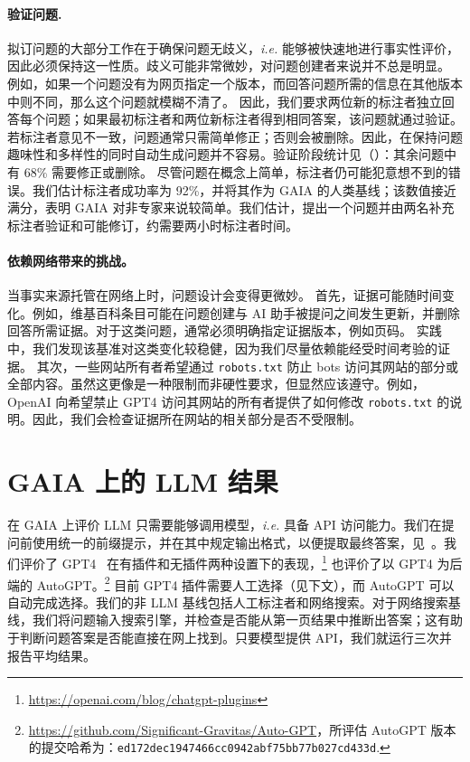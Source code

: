 \documentclass{fairmeta}
\newcommand{\benchmark}{\textsc{GAIA}}
\newcommand{\humanscore}{92\%}
\begin{document}
\paragraph{验证问题.} 拟订问题的大部分工作在于确保问题无歧义，\textit{i.e.} 能够被快速地进行事实性评价，因此必须保持这一性质。歧义可能非常微妙，对问题创建者来说并不总是明显。
例如，如果一个问题没有为网页指定一个版本，而回答问题所需的信息在其他版本中则不同，那么这个问题就模糊不清了。
因此，我们要求两位新的标注者独立回答每个问题；如果最初标注者和两位新标注者得到相同答案，该问题就通过验证。若标注者意见不一致，问题通常只需简单修正；否则会被删除。因此，在保持问题趣味性和多样性的同时自动生成问题并不容易。验证阶段统计见（）：其余问题中有 68\% 需要修正或删除。
尽管问题在概念上简单，标注者仍可能犯意想不到的错误。我们估计标注者成功率为 \humanscore{}，并将其作为 \benchmark{} 的人类基线；该数值接近满分，表明 \benchmark{} 对非专家来说较简单。我们估计，提出一个问题并由两名补充标注者验证和可能修订，约需要两小时标注者时间。



\paragraph{依赖网络带来的挑战。} 当事实来源托管在网络上时，问题设计会变得更微妙。
首先，证据可能随时间变化。例如，维基百科条目可能在问题创建与 AI 助手被提问之间发生更新，并删除回答所需证据。对于这类问题，通常必须明确指定证据版本，例如页码。
实践中，我们发现该基准对这类变化较稳健，因为我们尽量依赖能经受时间考验的证据。
其次，一些网站所有者希望通过 \texttt{robots.txt} 防止 bots 访问其网站的部分或全部内容。虽然这更像是一种限制而非硬性要求，但显然应该遵守。例如，OpenAI 向希望禁止 GPT4 访问其网站的所有者提供了如何修改 \texttt{robots.txt} 的说明。因此，我们会检查证据所在网站的相关部分是否不受限制。

\section{\benchmark{} 上的 LLM 结果}
\label{sec:evaluation}

\vspace{-.2cm}
在 \benchmark{} 上评价 LLM 只需要能够调用模型，\textit{i.e.} 具备 API 访问能力。我们在提问前使用统一的前缀提示，并在其中规定输出格式，以便提取最终答案，见~。我们评价了 GPT4~\citep{openai2023gpt4} 在有插件和无插件两种设置下的表现，\footnote{\url{https://openai.com/blog/chatgpt-plugins}} 也评价了以 GPT4 为后端的 AutoGPT。\footnote{\url{https://github.com/Significant-Gravitas/Auto-GPT}，所评估 AutoGPT 版本的提交哈希为：\texttt{ed172dec1947466cc0942abf75bb77b027cd433d}.} 目前 GPT4 插件需要人工选择（见下文），而 AutoGPT 可以自动完成选择。我们的非 LLM 基线包括人工标注者和网络搜索。对于网络搜索基线，我们将问题输入搜索引擎，并检查是否能从第一页结果中推断出答案；这有助于判断问题答案是否能直接在网上找到。只要模型提供 API，我们就运行三次并报告平均结果。
\end{document}
